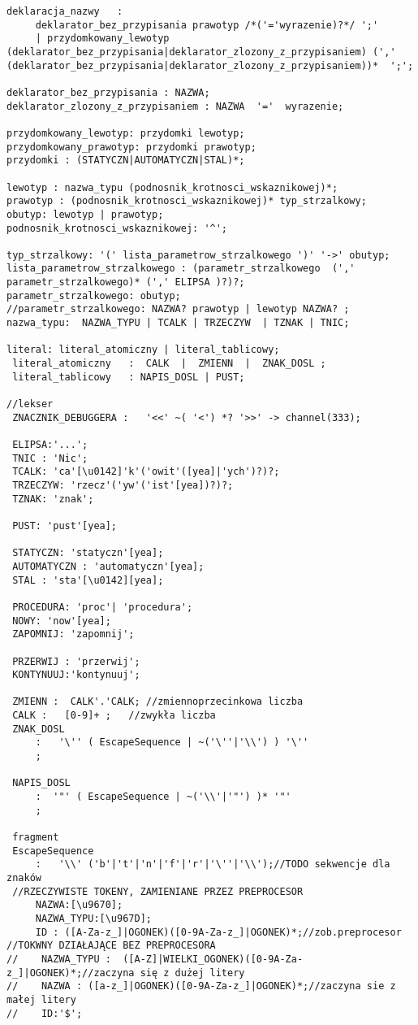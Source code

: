 \begin{lstlisting}[basicstyle=\scriptsize\ttfamily,breaklines=true]
deklaracja_nazwy   :
     deklarator_bez_przypisania prawotyp /*('='wyrazenie)?*/ ';'
     | przydomkowany_lewotyp (deklarator_bez_przypisania|deklarator_zlozony_z_przypisaniem) (',' (deklarator_bez_przypisania|deklarator_zlozony_z_przypisaniem))*  ';';

deklarator_bez_przypisania : NAZWA;
deklarator_zlozony_z_przypisaniem : NAZWA  '='  wyrazenie;

przydomkowany_lewotyp: przydomki lewotyp;
przydomkowany_prawotyp: przydomki prawotyp;
przydomki : (STATYCZN|AUTOMATYCZN|STAL)*;

lewotyp : nazwa_typu (podnosnik_krotnosci_wskaznikowej)*;
prawotyp : (podnosnik_krotnosci_wskaznikowej)* typ_strzalkowy;
obutyp: lewotyp | prawotyp;
podnosnik_krotnosci_wskaznikowej: '^';

typ_strzalkowy: '(' lista_parametrow_strzalkowego ')' '->' obutyp;
lista_parametrow_strzalkowego : (parametr_strzalkowego  (',' parametr_strzalkowego)* (',' ELIPSA )?)?;
parametr_strzalkowego: obutyp;
//parametr_strzalkowego: NAZWA? prawotyp | lewotyp NAZWA? ;
nazwa_typu:  NAZWA_TYPU | TCALK | TRZECZYW  | TZNAK | TNIC;

literal: literal_atomiczny | literal_tablicowy;
 literal_atomiczny   :  CALK  |  ZMIENN  |  ZNAK_DOSL ;
 literal_tablicowy   : NAPIS_DOSL | PUST;

//lekser
 ZNACZNIK_DEBUGGERA :   '<<' ~( '<') *? '>>' -> channel(333);

 ELIPSA:'...';
 TNIC : 'Nic';
 TCALK: 'ca'[\u0142]'k'('owit'([yea]|'ych')?)?;
 TRZECZYW: 'rzecz'('yw'('ist'[yea])?)?;
 TZNAK: 'znak';

 PUST: 'pust'[yea];

 STATYCZN: 'statyczn'[yea];
 AUTOMATYCZN : 'automatyczn'[yea];
 STAL : 'sta'[\u0142][yea];

 PROCEDURA: 'proc'| 'procedura';
 NOWY: 'now'[yea];
 ZAPOMNIJ: 'zapomnij';

 PRZERWIJ : 'przerwij';
 KONTYNUUJ:'kontynuuj';

 ZMIENN :  CALK'.'CALK; //zmiennoprzecinkowa liczba
 CALK :   [0-9]+ ;   //zwykła liczba
 ZNAK_DOSL
     :   '\'' ( EscapeSequence | ~('\''|'\\') ) '\''
     ;

 NAPIS_DOSL
     :  '"' ( EscapeSequence | ~('\\'|'"') )* '"'
     ;

 fragment
 EscapeSequence
     :   '\\' ('b'|'t'|'n'|'f'|'r'|'\''|'\\');//TODO sekwencje dla znaków
 //RZECZYWISTE TOKENY, ZAMIENIANE PRZEZ PREPROCESOR
     NAZWA:[\u9670];
     NAZWA_TYPU:[\u967D];
     ID : ([A-Za-z_]|OGONEK)([0-9A-Za-z_]|OGONEK)*;//zob.preprocesor
//TOKWNY DZIAŁAJĄCE BEZ PREPROCESORA
//    NAZWA_TYPU :  ([A-Z]|WIELKI_OGONEK)([0-9A-Za-z_]|OGONEK)*;//zaczyna się z dużej litery
//    NAZWA : ([a-z_]|OGONEK)([0-9A-Za-z_]|OGONEK)*;//zaczyna sie z małej litery
//    ID:'$';


\end{lstlisting}
